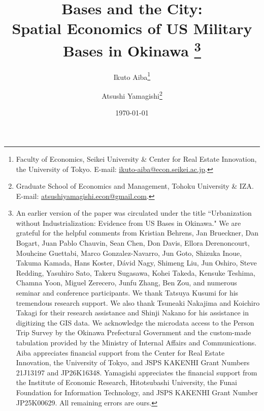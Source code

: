 \documentclass[12pt, unicode, a4paper]{article}
\newcommand{\1}{\mbox{1}\hspace{-0.25em}\mbox{l}} %
\begin{document}

\title{Bases and the City: \\ Spatial Economics of US Military Bases in Okinawa
\thanks{
An earlier version of the paper was circulated under the title ``Urbanization without Industrialization: Evidence from US Bases in Okinawa."
We are grateful for the helpful comments from Kristian Behrens, Jan Brueckner, Dan Bogart, Juan Pablo Chauvin, Sean Chen, Don Davis, Ellora Derenoncourt, Mouhcine Guettabi, Marco Gonzalez-Navarro, Jun Goto, Shizuka Inoue, Takuma Kamada, Hans Koster, D\'{a}vid Nagy, Shimeng Liu, Jun Oshiro, Steve Redding, Yasuhiro Sato, Takeru Sugasawa, Kohei Takeda, Kensuke Teshima, Chamna Yoon, Miguel Zerecero, Junfu Zhang, Ben Zou, and numerous seminar and conference participants. We thank Tatsuya Kusumi for his tremendous research support. We also thank Tsuneaki Nakajima and Koichiro Takagi for their research assistance and Shinji Nakano for his assistance in digitizing the GIS data. 
We acknowledge the microdata access to the Person Trip Survey by the Okinawa Prefectural Government and the custom-made tabulation provided by the Ministry of Internal Affairs and Communications.
Aiba appreciates financial support from the Center for Real Estate Innovation, the University of Tokyo, and JSPS KAKENHI Grant Numbers 21J13197 and JP26K16348. Yamagishi appreciates the financial support from the Institute of Economic Research, Hitotsubashi University, the Funai Foundation for Information Technology, and JSPS KAKENHI Grant Number JP25K00629. All remaining errors are ours.
}}
\author{
Ikuto Aiba\thanks{Faculty of Economics, Seikei University \& Center for Real Estate Innovation, the University of Tokyo. E-mail: \href{mailto:ikuto-aiba@econ.seikei.ac.jp}{\color{blue} ikuto-aiba@econ.seikei.ac.jp}.} 
\and 
Atsushi Yamagishi\thanks{Graduate School of Economics and Management, Tohoku University \& IZA. E-mail: \href{mailto:atsushiyamagishi.econ@gmail.com}{\color{blue} atsushiyamagishi.econ@gmail.com}.}
}


\date{ \today \\ }
\end{document}
